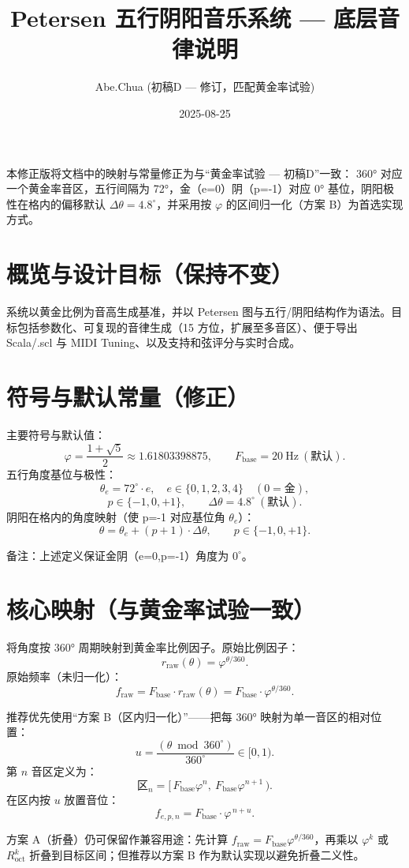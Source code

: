 \documentclass{article}
\title{Petersen 五行阴阳音乐系统 — 底层音律说明}
\author{Abe.Chua (初稿D — 修订，匹配黄金率试验)}
\date{2025-08-25}
\begin{document}
\maketitle

本修正版将文档中的映射与常量修正为与“黄金率试验 — 初稿D”一致：
360° 对应一个黄金率音区，五行间隔为 72°，金（e=0）阴（p=-1）对应 0° 基位，阴阳极性在格内的偏移默认 $\Delta\theta=4.8^\circ$，并采用按 $\varphi$ 的区间归一化（方案 B）为首选实现方式。

\section{概览与设计目标（保持不变）}
系统以黄金比例为音高生成基准，并以 Petersen 图与五行/阴阳结构作为语法。目标包括参数化、可复现的音律生成（15 方位，扩展至多音区）、便于导出 Scala/.scl 与 MIDI Tuning、以及支持和弦评分与实时合成。

\section{符号与默认常量（修正）}
主要符号与默认值：
\[
\varphi=\frac{1+\sqrt5}{2}\approx1.61803398875,\qquad F_{\mathrm{base}}=20\ \mathrm{Hz}\ (\text{默认}).
\]
五行角度基位与极性：
\[
\theta_e = 72^\circ\cdot e,\quad e\in\{0,1,2,3,4\}\quad(0=\text{金}),
\]
\[
p\in\{-1,0,+1\},\qquad \Delta\theta = 4.8^\circ\ (\text{默认}).
\]
阴阳在格内的角度映射（使 p=-1 对应基位角 \(\theta_e\)）：
\[
\theta = \theta_e + (p+1)\cdot\Delta\theta,\qquad p\in\{-1,0,+1\}.
\]

备注：上述定义保证金阴（e=0,p=-1）角度为 \(0^\circ\)。

\section{核心映射（与黄金率试验一致）}
将角度按 360° 周期映射到黄金率比例因子。原始比例因子：
\[
r_{\mathrm{raw}}(\theta)=\varphi^{\theta/360}.
\]
原始频率（未归一化）：
\[
f_{\mathrm{raw}} = F_{\mathrm{base}}\cdot r_{\mathrm{raw}}(\theta)=F_{\mathrm{base}}\cdot\varphi^{\theta/360}.
\]

推荐优先使用“方案 B（区内归一化）”——把每 360° 映射为单一音区的相对位置：
\[
u=\frac{(\theta \bmod 360^\circ)}{360^\circ}\in[0,1).
\]
第 \(n\) 音区定义为：
\[
\text{区}_n=[\,F_{\mathrm{base}}\varphi^{n},\ F_{\mathrm{base}}\varphi^{n+1}\,).
\]
在区内按 \(u\) 放置音位：
\[
f_{e,p,n} = F_{\mathrm{base}}\cdot \varphi^{\,n+u}.
\]

方案 A（折叠）仍可保留作兼容用途：先计算 \(f_{\mathrm{raw}}=F_{\mathrm{base}}\varphi^{\theta/360}\)，再乘以 \(\varphi^{k}\) 或 \(R_{\mathrm{oct}}^{k}\) 折叠到目标区间；但推荐以方案 B 作为默认实现以避免折叠二义性。
\end{document}
